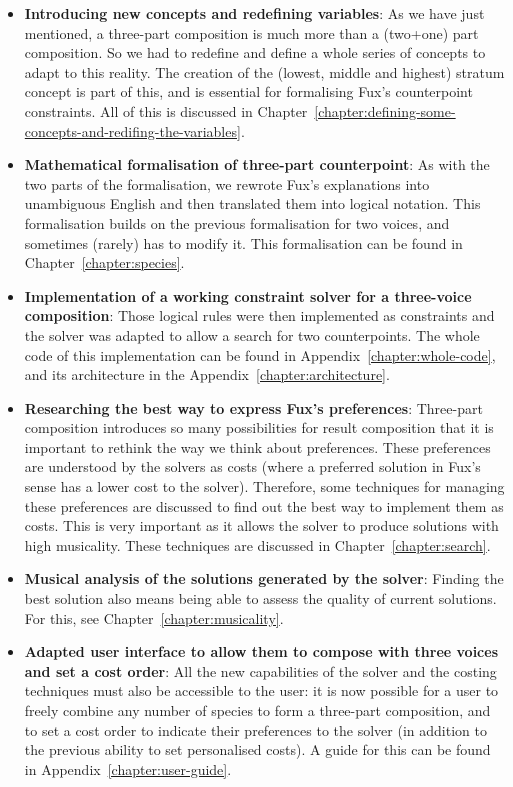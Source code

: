 \begin{itemize}
    \item \textbf{Introducing new concepts and redefining variables}:
    As we have just mentioned, a three-part composition is much more than a (two+one) part composition. So we had to redefine and define a whole series of concepts to adapt to this reality. The creation of the (lowest, middle and highest) stratum concept is part of this, and is essential for formalising Fux's counterpoint constraints. All of this is discussed in Chapter~\ref{chapter:defining-some-concepts-and-redifing-the-variables}.
    \item \textbf{Mathematical formalisation of three-part counterpoint}: As with the two parts of the formalisation, we rewrote Fux's explanations into unambiguous English and then translated them into logical notation. This formalisation builds on the previous formalisation for two voices, and sometimes (rarely) has to modify it. This formalisation can be found in Chapter~\ref{chapter:species}.
    \item \textbf{Implementation of a working constraint solver for a three-voice composition}: Those logical rules were then implemented as constraints and the solver was adapted to allow a search for two counterpoints. The whole code of this implementation can be found in Appendix~\ref{chapter:whole-code}, and its architecture in the Appendix~\ref{chapter:architecture}.
    \item \textbf{Researching the best way to express Fux's preferences}: Three-part composition introduces so many possibilities for result composition that it is important to rethink the way we think about preferences. These preferences are understood by the solvers as costs (where a preferred solution in Fux's sense has a lower cost to the solver). Therefore, some techniques for managing these preferences are discussed to find out the best way to implement them as costs. This is very important as it allows the solver to produce solutions with high musicality. These techniques are discussed in Chapter~\ref{chapter:search}.
    \item \textbf{Musical analysis of the solutions generated by the solver}: Finding the best solution also means being able to assess the quality of current solutions. For this, see Chapter~\ref{chapter:musicality}. 
    \item \textbf{Adapted user interface to allow them to compose with three voices and set a cost order}: All the new capabilities of the solver and the costing techniques must also be accessible to the user: it is now possible for a user to freely combine any number of species to form a three-part composition, and to set a cost order to indicate their preferences to the solver (in addition to the previous ability to set personalised costs). A guide for this can be found in Appendix~\ref{chapter:user-guide}.
\end{itemize}


